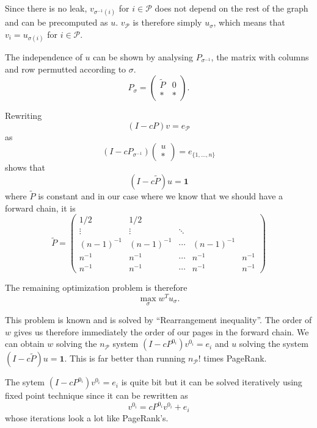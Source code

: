 \documentclass{article}
\newcommand{\1}{\mathbf{1}}
\theoremstyle{definition}
\begin{document}
Since there is no leak, $v_{\sigma^{-1}(i)}$ for $i \in \mathcal{P}$ does not depend on the rest of the graph and can be precomputed as \(u\).
$v_\mathcal{P}$ is therefore simply $u_\sigma$, which means that $v_i = u_{\sigma(i)}$ for $i \in \mathcal{P}$.

The independence of $u$ can be shown by analysing $P_{\sigma^{-1}}$, the matrix with columns and row permutted according to $\sigma$.
\[ P_\sigma =
  \begin{pmatrix}
    \tilde{P} & 0\\
    * & *
  \end{pmatrix}.
\]

Rewriting
\[ (I - cP)v = e_\mathcal{P} \]
as
\[ (I - cP_{\sigma^{-1}})
\begin{pmatrix}
u\\
*
\end{pmatrix}
= e_{\{1,\ldots,n\}} \]
shows that
\[ (I - c\tilde{P})u = \1 \]
where $\tilde{P}$ is constant and in our case
where we know that we should have a forward chain, it is
\[
  \tilde{P} =
  \begin{pmatrix}
    1/2 & 1/2 & & &\\
    \vdots & \vdots & \ddots & &\\
    (n-1)^{-1} & (n-1)^{-1} & \cdots & (n-1)^{-1} & \\
    n^{-1} & n^{-1} & \cdots & n^{-1} & n^{-1}\\
    n^{-1} & n^{-1} & \cdots & n^{-1} & n^{-1}
  \end{pmatrix}
\]

The remaining optimization problem is therefore
\[ \max_\sigma w^T u_\sigma. \]

This problem is known and is solved by ``Rearrangement inequality''.
The order of \(w\) gives us therefore immediately the order of our pages in the forward chain.
We can obtain \(w\) solving the \(n_\mathcal{P}\) system \((I - cP^{0_i})v^{0_i} = e_i\)
and \(u\) solving the system \((I - c\tilde{P})u = \1\).
This is far better than running \(n_\mathcal{P}!\) times PageRank.

The sytem \((I - cP^{0_i})v^{0_i} = e_i\) is quite bit but it can be solved iteratively using fixed point technique since
it can be rewritten as
\[ v^{0_i} = cP^{0_i}v^{0_i} + e_i \]
whose iterations look a lot like PageRank's.
\end{document}
